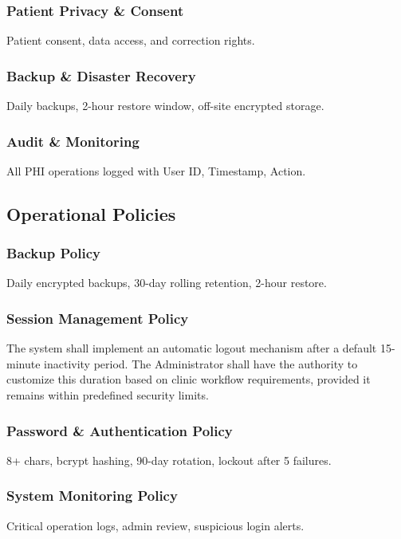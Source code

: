 \subsubsection{Patient Privacy \& Consent}
Patient consent, data access, and correction rights.

\subsubsection{Backup \& Disaster Recovery}
Daily backups, 2-hour restore window, off-site encrypted storage.

\subsubsection{Audit \& Monitoring}
All PHI operations logged with User ID, Timestamp, Action.

\subsection{Operational Policies}

\subsubsection{Backup Policy}
Daily encrypted backups, 30-day rolling retention, 2-hour restore.

\subsubsection{Session Management Policy}
The system shall implement an automatic logout mechanism after a default 15-minute inactivity period. The Administrator shall have the authority to customize this duration based on clinic workflow requirements, provided it remains within predefined security limits.

\subsubsection{Password \& Authentication Policy}
8+ chars, bcrypt hashing, 90-day rotation, lockout after 5 failures.

\subsubsection{System Monitoring Policy}
Critical operation logs, admin review, suspicious login alerts.